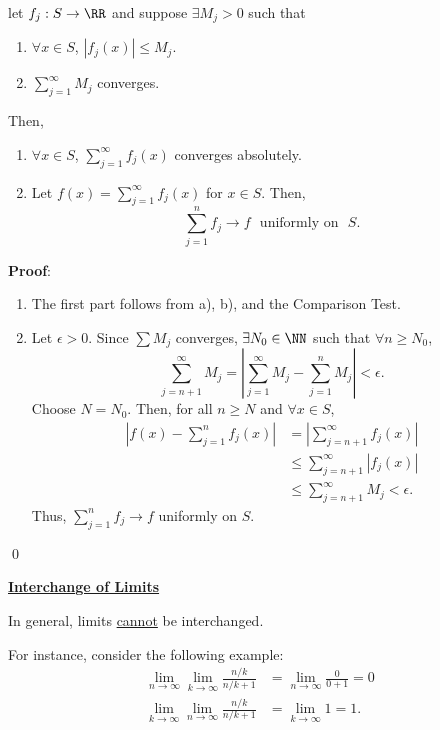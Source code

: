 \begin{theorem}
let $f_j:S\to \RR$ and suppose $\exists M_j>0$ such that 
\begin{enumerate}[label = \alph*)]
    \item $\forall x\in S$, $|f_j(x)|\leq M_j$.
    \item $\sum_{j=1}^\infty M_j$ converges.
\end{enumerate}
Then,
\begin{enumerate}
    \item $\forall x\in S$, $\sum_{j=1}^\infty f_j(x)$ converges absolutely.
    \item Let $f(x) = \sum_{j=1}^\infty f_j(x)$ for $x\in S.$ Then,
    \[
    \sum_{j=1}^n f_j\to f \text{~~uniformly on~~} S.
    \]
\end{enumerate}
\end{theorem}
\textbf{Proof}: 
\begin{enumerate}
    \item The first part follows from a), b), and the Comparison Test.
    \item Let $\epsilon>0$. Since $\sum M_j$ converges, $\exists N_0\in\NN$ such that $\forall n\geq N_0$,
    \[
    \sum_{j=n+1}^\infty M_j = \left|\sum_{j=1}^\infty M_j - \sum_{j=1}^{n}M_j\right|<\epsilon.
    \]
    Choose $N= N_0$. Then, for all $n\geq N$ and $\forall x\in S$,
    \begin{align*}
        \left|f(x) - \sum_{j=1}^n f_j(x)\right| &= \left| \sum_{j=n+1}^\infty f_j(x)\right| \\
        &\leq \sum_{j=n+1}^\infty |f_j(x)| \\
        &\leq \sum_{j=n+1}^\infty M_j < \epsilon.
    \end{align*}
    Thus, $\sum_{j=1}^n f_j \to f$ uniformly on $S$.
\end{enumerate}\qed 

\noindent\underline{\textbf{Interchange of Limits}}

\begin{remark}
In general, limits \underline{cannot} be interchanged.
\end{remark}

\begin{example}
For instance, consider the following example:
\begin{align*}
    \lim_{n\to \infty} \lim_{k\to \infty} \frac{n/k}{n/k + 1} &= \lim_{n\to \infty} \frac{0}{0+1} = 0 \\
    \lim_{k\to \infty} \lim_{n\to \infty} \frac{n/k}{n/k + 1} &= \lim_{k\to \infty} 1 = 1.
\end{align*}
\end{example}

